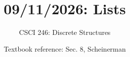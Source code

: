 \documentclass[dvipsnames, 10pt]{beamer}
\begin{document}
\title{09/11/2026: Lists}
\author{CSCI 246: Discrete Structures}
\date{Textbook reference: Sec. 8, Scheinerman}

\begin{frame}
    \titlepage 
\end{frame}


%
%
%
%
%
%
%
%
%
\end{document}

